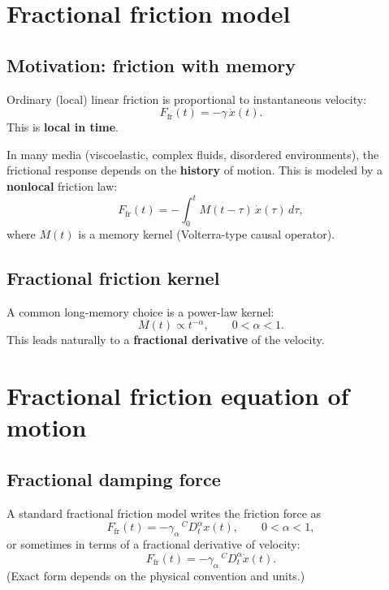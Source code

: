 
\section{Fractional friction model}

\subsection{Motivation: friction with memory}
Ordinary (local) linear friction is proportional to instantaneous velocity:
\begin{equation}
F_{\text{fr}}(t) = -\gamma\,\dot{x}(t).
\end{equation}
This is \textbf{local in time}.

In many media (viscoelastic, complex fluids, disordered environments),
the frictional response depends on the \textbf{history} of motion.
This is modeled by a \textbf{nonlocal} friction law:
\begin{equation}
F_{\text{fr}}(t) = -\int_0^t M(t-\tau)\,\dot{x}(\tau)\,d\tau,
\end{equation}
where $M(t)$ is a memory kernel (Volterra-type causal operator).

\subsection{Fractional friction kernel}
A common long-memory choice is a power-law kernel:
\begin{equation}
M(t)\propto t^{-\alpha},
\qquad 0<\alpha<1.
\end{equation}
This leads naturally to a \textbf{fractional derivative} of the velocity.


\section{Fractional friction equation of motion}

\subsection{Fractional damping force}
A standard fractional friction model writes the friction force as
\begin{equation}
\boxed{
F_{\text{fr}}(t) = -\gamma_\alpha\,{}^{C}D_t^\alpha x(t),
\qquad 0<\alpha<1,
}
\end{equation}
or sometimes in terms of a fractional derivative of velocity:
\begin{equation}
F_{\text{fr}}(t) = -\gamma_\alpha\,{}^{C}D_t^\alpha \dot{x}(t).
\end{equation}
(Exact form depends on the physical convention and units.)

